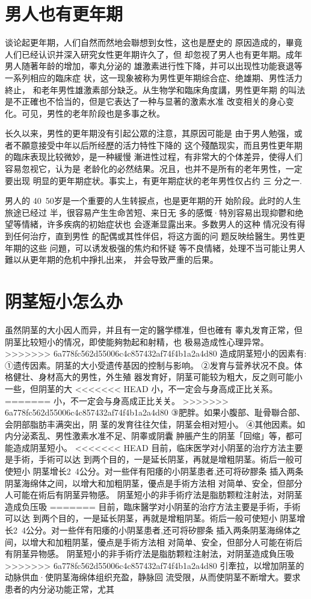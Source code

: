 \documentclass[12pt,UTF8]{ctexbook}
\begin{document}
\section{男人也有更年期}

谈论起更年期，人们自然而然地会聯想到女性，这也是歷史的
原因造成的，畢竟人们已经认识并深入研究女性更年期许久了，但
却忽视了男人也有更年期。成年男人随著年龄的增加，睾丸分泌的
雄激素进行性下降，并可以出现性功能衰退等一系列相应的臨床症
状，这一现象被称为男性更年期综合症、绝雄期、男性活力終止，
和老年男性雄激素部分缺乏。从生物学和臨床角度講，男性更年期
的叫法是不正確也不恰当的，但是它表达了一种与显著的激素水准
改变相关的身心变化。可见，男性的老年阶段也是多事之秋。

长久以来，男性的更年期没有引起公眾的注意，其原因可能是
由于男人勉强，或者不願意接受中年以后所经歷的活力特性下降的
这个殘酷现实，而且男性更年期的臨床表现比较微妙，是一种緩慢
漸进性过程，有非常大的个体差异，使得人们容易忽视它，认为是
老龄化的必然结果。况且，也并不是所有的老年男性，一定要出现
明显的更年期症状。事实上，有更年期症状的老年男性仅占约 三
分之一.

男人的 40~50岁是一个重要的人生转捩点，也是更年期的开
始阶段。此时的人生旅途已经过
半，很容易产生生命苦短、来日无
多的感慨·特別容易出现抑鬱和绝
望等情緒，许多疾病的初始症状也
会逐漸显露出来。多数男人的这种
情况没有得到任何治疗，直到男性
的配偶或其性伴侣，将这方面的问
题反映给醫生。男性更年期的这些
问題，可以诱发极强的焦灼和怀疑
等不良情緒，处理不当可能让男人
難以从更年期的危机中掙扎出来，
并会导致严重的后果。

\section{阴茎短小怎么办}

虽然阴茎的大小因人而异，并且有一定的醫学標准，但也確有
睾丸发育正常，但阴茎比较短小的情况，即使能夠勃起和射精，也
极易造成性心理异常。
>>>>>>> 6a778fc562d55006c4c857432af74f4b1a2a4d80
造成阴茎短小的因素有:
①遗传因素。阴茎的大小受遗传基因的控制与影响。
②发育与营养状况不良。体格健壮、身材高大的男性，外生殖
器发育好，阴茎可能较为粗大，反之则可能小一些，但阴茎的大
<<<<<<< HEAD
小，不一定会与身高成正比关系。
=======
小，不一定会与身高成正比关关。
>>>>>>> 6a778fc562d55006c4c857432af74f4b1a2a4d80
③肥胖。如果小腹部、耻骨聯合部、会阴部脂肪丰满突出，阴
茎的发育往往欠佳，阴茎会相对短小。
④其他因素。如内分泌紊乱、男性激素水准不足、阴睾或阴囊
肿脹产生的阴茎「回缩」等，都可能造成阴茎短小。
<<<<<<< HEAD
目前，临床医学对小阴茎的治疗方法主要是手術，手術可以达
到两个目的，一是延长阴茎，再就是增粗阴茎。術后一般可使短小
阴茎增长2~4公分。对一些伴有阳痿的小阴茎患者,还可将矽膠条
插入两条阴茎海绵体之间，以增大和加粗阴茎，優点是手術方法相
对简单、安全，但部分人可能在術后有阴茎异物感。
阴茎短小的非手術疗法是脂肪颗粒注射法，对阴茎造成负压吸
=======
目前，臨床醫学对小阴茎的治疗方法主要是手術，手術可以达
到两个目的，一是延长阴茎，再就是增粗阴茎。術后一般可使短小
阴茎增长2~4公分。对一些伴有阳痿的小阴茎患者,还可将矽膠条
插入两条阴茎海绵体之间，以增大和加粗阴茎，優点是手術方法相
对简单、安全，但部分人可能在術后有阴茎异物感。
阴茎短小的非手術疗法是脂肪颗粒注射法，对阴茎造成負压吸
>>>>>>> 6a778fc562d55006c4c857432af74f4b1a2a4d80
引牽拉，以增加阴茎的动脉供血·使阴茎海绵体组织充盈，静脉回
流受限，从而使阴茎不断增大。要求患者的内分泌功能正常，尤其
\end{document}
